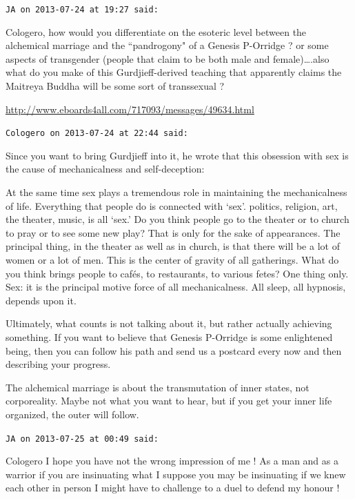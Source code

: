 \begin{footnotesize}\begin{sffamily}



\texttt{JA on 2013-07-24 at 19:27 said: }

Cologero, how would you differentiate on the esoteric level between the alchemical marriage and the ``pandrogony" of a Genesis P-Orridge ? or some aspects of transgender (people that claim to be both male and female)….also what do you make of this Gurdjieff-derived teaching that apparently claims the Maitreya Buddha will be some sort of transsexual ? 

\url{http://www.eboards4all.com/717093/messages/49634.html}


\hfill

\texttt{Cologero on 2013-07-24 at 22:44 said: }

Since you want to bring Gurdjieff into it, he wrote that this obsession with sex is the cause of mechanicalness and self-deception:

\begin{quotex}
At the same time sex plays a tremendous role in maintaining the mechanicalness of life. Everything that people do is connected with `sex'. politics, religion, art, the theater, music, is all `sex.' Do you think people go to the theater or to church to pray or to see some new play? That is only for the sake of appearances. The principal thing, in the theater as well as in church, is that there will be a lot of women or a lot of men. This is the center of gravity of all gatherings. What do you think brings people to cafés, to restaurants, to various fetes? One thing only. Sex: it is the principal motive force of all mechanicalness. All sleep, all hypnosis, depends upon it. 

\end{quotex}
Ultimately, what counts is not talking about it, but rather actually achieving something. If you want to believe that Genesis P-Orridge is some enlightened being, then you can follow his path and send us a postcard every now and then describing your progress.

The alchemical marriage is about the transmutation of inner states, not corporeality. Maybe not what you want to hear, but if you get your inner life organized, the outer will follow.


\hfill

\texttt{JA on 2013-07-25 at 00:49 said: }

Cologero I hope you have not the wrong impression of me ! As a man and as a warrior if you are insinuating what I suppose you may be insinuating if we knew each other in person I might have to challenge to a duel to defend my honour !


\end{sffamily}
\end{footnotesize}
